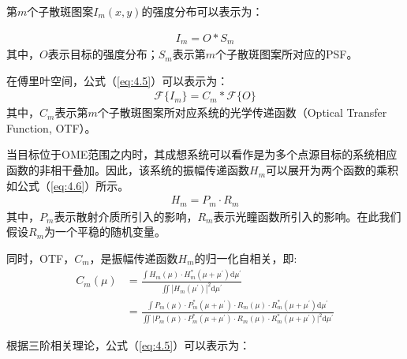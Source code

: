 第$m$个子散斑图案$I_m(x,y)$的强度分布可以表示为\cite{goodman_speckle_2007,goodman_introduction_2005}：

\begin{equation}
\begin{aligned}
    I_m = O*S_m
\end{aligned}
\label{eq:4.4}
\end{equation}其中，$O$表示目标的强度分布；$S_m$表示第$m$个子散斑图案所对应的PSF。

在傅里叶空间，公式（\ref{eq:4.5}）可以表示为\cite{goodman_speckle_2007,goodman_introduction_2005}：
\begin{equation}
\begin{aligned}
    \mathcal{F} \{ I_m \} = C_m*\mathcal{F}\{ O \}
\end{aligned}
\label{eq:4.5}
\end{equation}其中，$C_m$表示第$m$个子散斑图案所对应系统的光学传递函数（Optical Transfer Function, OTF）。

当目标位于OME范围之内时，其成想系统可以看作是为多个点源目标的系统相应函数的非相干叠加\cite{goodman_speckle_2007,goodman_introduction_2005}。因此，该系统的振幅传递函数$H_m$可以展开为两个函数的乘积如公式（\ref{eq:4.6}）所示。
\begin{equation}
\begin{aligned}
    H_m = P_m \cdot R_m
\end{aligned}
\label{eq:4.6}
\end{equation}其中，$P_m$表示散射介质所引入的影响，$R_m$表示光瞳函数所引入的影响。在此我们假设$R_m$为一个平稳的随机变量。

同时，OTF，$C_m$，是振幅传递函数$H_m$的归一化自相关，即:
\begin{equation}
\begin{aligned}
    C_m(\mu) &= \frac{\int{H_m(\mu) \cdot H_m^{*}(\mu + \mu^{\prime})}\mathrm{d}{\mu^{\prime}}}{\iint{|H_m(\mu^{\prime})|^2}\mathrm{d}{\mu^{\prime}}}\\
    &=\frac{\int{P_m(\mu) \cdot P_m^{*}(\mu + \mu^{\prime})} \cdot {R_m(\mu) \cdot R_m^{*}(\mu + \mu^{\prime})} \mathrm{d}{\mu^{\prime}}}{\iint{|P_m(\mu) \cdot P_m^{*}(\mu + \mu^{\prime})} \cdot {R_m(\mu) \cdot R_m^{*}(\mu + \mu^{\prime})}|^2 \mathrm{d}{\mu^{\prime}}}
\end{aligned}
\label{eq:4.7}
\end{equation}

根据三阶相关理论\cite{lohmann_speckle_1983,northcott_algorithms_1988}，公式（\ref{eq:4.5}）可以表示为：

